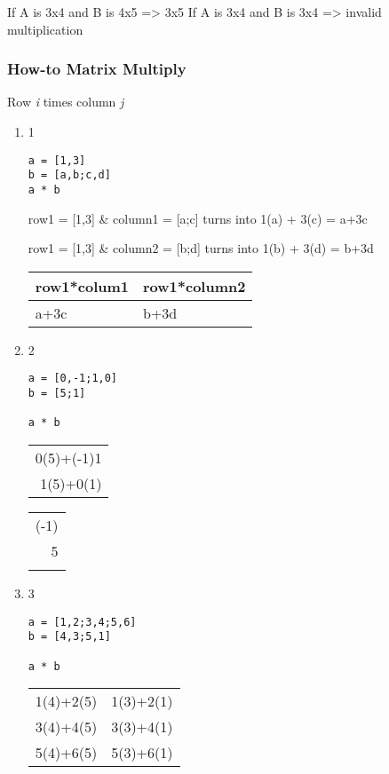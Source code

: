 \documentclass[11pt]{article}
\begin{document}
If A is 3x4 and B is 4x5 => 3x5
If A is 3x4 and B is 3x4 => invalid multiplication
\subsubsection{How-to Matrix Multiply}
\label{sec:org173f627}
Row \emph{i} times column \emph{j}
\begin{enumerate}
\item 1
\label{sec:org4189598}
\begin{verbatim}
a = [1,3]
b = [a,b;c,d]
a * b
\end{verbatim}

row1 = [1,3] \& column1 = [a;c]
turns into
1(a) + 3(c) = a+3c

row1 = [1,3] \& column2 = [b;d]
turns into
1(b) + 3(d) = b+3d

\begin{center}
\begin{tabular}{ll}
row1*colum1 & row1*column2\\
\hline
a+3c & b+3d\\
\end{tabular}
\end{center}
\item 2
\label{sec:org7dcc243}
\begin{verbatim}
a = [0,-1;1,0]
b = [5;1]

a * b
\end{verbatim}

\begin{center}
\begin{tabular}{r}
0(5)+(-1)1\\
1(5)+0(1)\\
\end{tabular}
\end{center}

\begin{center}
\begin{tabular}{r}
(-1)\\
5\\
\\
\end{tabular}
\end{center}
\item 3
\label{sec:org45c19b1}
\begin{verbatim}
a = [1,2;3,4;5,6]
b = [4,3;5,1]

a * b
\end{verbatim}

\begin{center}
\begin{tabular}{rr}
1(4)+2(5) & 1(3)+2(1)\\
3(4)+4(5) & 3(3)+4(1)\\
5(4)+6(5) & 5(3)+6(1)\\
\end{tabular}
\end{center}


\end{enumerate}
\end{document}
